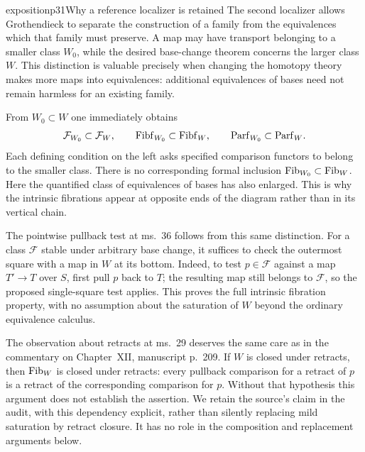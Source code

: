 \begin{dcomment}{exposition}{p31}{Why a reference localizer is retained}
The second localizer allows Grothendieck to separate the construction of a family from the equivalences which that family must preserve. A map may have transport belonging to a smaller class $W_0$, while the desired base-change theorem concerns the larger class $W$. This distinction is valuable precisely when changing the homotopy theory makes more maps into equivalences: additional equivalences of bases need not remain harmless for an existing family.

From $W_0\subset W$ one immediately obtains
\[
 \mathcal F_{W_0}\subset\mathcal F_W,\qquad
 \mathrm{Fibf}_{W_0}\subset\mathrm{Fibf}_W,\qquad
 \mathrm{Parf}_{W_0}\subset\mathrm{Parf}_W.
\]
Each defining condition on the left asks specified comparison functors to belong to the smaller class. There is no corresponding formal inclusion $\mathrm{Fib}_{W_0}\subset\mathrm{Fib}_W$. Here the quantified class of equivalences of bases has also enlarged. This is why the intrinsic fibrations appear at opposite ends of the diagram rather than in its vertical chain.

The pointwise pullback test at ms.~36 follows from this same distinction. For a class $\mathcal F$ stable under arbitrary base change, it suffices to check the outermost square with a map in $W$ at its bottom. Indeed, to test $p\in\mathcal F$ against a map $T'\to T$ over $S$, first pull $p$ back to $T$; the resulting map still belongs to $\mathcal F$, so the proposed single-square test applies. This proves the full intrinsic fibration property, with no assumption about the saturation of $W$ beyond the ordinary equivalence calculus.

The observation about retracts at ms.~29 deserves the same care as in the commentary on Chapter~XII, manuscript p.~209. If $W$ is closed under retracts, then $\mathrm{Fib}_W$ is closed under retracts: every pullback comparison for a retract of $p$ is a retract of the corresponding comparison for $p$. Without that hypothesis this argument does not establish the assertion. We retain the source's claim in the audit, with this dependency explicit, rather than silently replacing mild saturation by retract closure. It has no role in the composition and replacement arguments below.
\end{dcomment}


